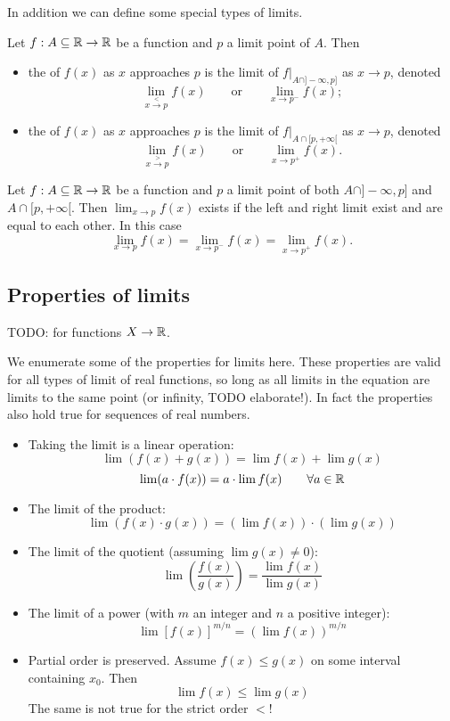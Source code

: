 In addition we can define some special types of limits.
\begin{definition}
Let $f:A\subseteq\mathbb{R}\to\mathbb{R}$ be a function and $p$ a limit point of $A$. Then
\begin{itemize}
\item the  of $f(x)$ as $x$ approaches $p$ is the limit of $f|_{A\cap]-\infty,p]}$ as $x\to p$, denoted
\[ \lim_{x\overset{<}{\to} p}f(x) \qquad \text{or} \qquad \lim_{x\to p^-}f(x); \]
\item the  of $f(x)$ as $x$ approaches $p$ is the limit of $f|_{A\cap[p,+\infty[}$ as $x\to p$, denoted
\[ \lim_{x\overset{>}{\to} p}f(x) \qquad \text{or} \qquad \lim_{x\to p^+}f(x). \]
\end{itemize}
\end{definition}

\begin{lemma}
Let $f:A\subseteq\mathbb{R}\to\mathbb{R}$ be a function and $p$ a limit point of both $A\cap]-\infty,p]$ and $A\cap[p,+\infty[$. Then $\lim_{x\to p} f(x)$ exists if the left and right limit exist and are equal to each other. In this case
\[ \lim_{x\to p} f(x) = \lim_{x\to p^-} f(x) = \lim_{x\to p^+} f(x). \]
\end{lemma}

\subsection{Properties of limits}
TODO: for functions $X\to \mathbb{R}$.

We enumerate some of the properties for limits here. These properties are valid for all types of limit of real functions, so long as all limits in the equation are limits to the same point (or infinity, TODO elaborate!).  In fact the properties also hold true for sequences of real numbers.
\begin{itemize}
\item Taking the limit is a linear operation:
\[\lim  (f(x) + g(x)) = \lim  f(x) + \lim g(x)\]
\[\lim  (a\cdot f(x)) = a\cdot \lim  f(x) \qquad \forall a \in \mathbb{R}\]
\item The limit of the product:
\[ \lim (f(x)\cdot g(x)) = \left(\lim  f(x)\right) \cdot \left(\lim  g(x)\right) \]
\item The limit of the quotient (assuming $\lim  g(x) \neq 0$):
\[ \lim \left(\frac{f(x)}{g(x)}\right) = \frac{\lim  f(x)}{\lim  g(x)}  \]
\item The limit of a power (with $m$ an integer and $n$ a positive integer):
\[ \lim  [f(x)]^{m/n} = \left(\lim  f(x)\right)^{m/n} \]
\item Partial order is preserved. Assume $f(x) \leq g(x)$ on some interval containing $x_0$. Then
\[ \lim f(x) \leq \lim g(x) \]
The same is not true for the strict order $<$!
\end{itemize}

